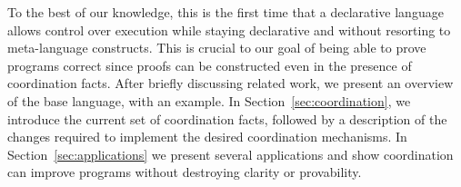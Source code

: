 To the best of our knowledge, this is the first time that a declarative language
allows control over execution while staying declarative and without resorting to
meta-language constructs. This is crucial to our goal of being able to prove
programs correct since proofs can be constructed even in the presence of
coordination facts.  After briefly discussing related work, we present an
overview of the base language, with an example. In
Section~\ref{sec:coordination}, we introduce the current set of coordination
facts, followed by a description of the changes required to implement the
desired coordination mechanisms. In Section~\ref{sec:applications} we present
several applications and show coordination can improve programs without
destroying clarity or provability.

